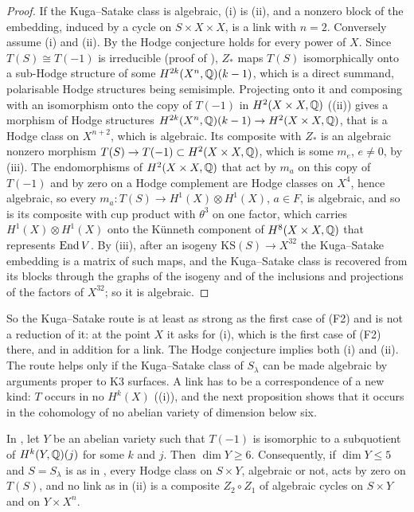 \begin{proof}
If the Kuga--Satake class is algebraic, (i) is (ii), and a
nonzero block of the embedding, induced by a cycle on $S\times X\times X$, is
a link with $n=2$. Conversely assume (i) and (ii). By
 the Hodge conjecture holds for every power of $X$.
Since $T(S)\cong T(-1)$ is irreducible (proof of ),
$Z_{*}$ maps $T(S)$ isomorphically onto a sub-Hodge structure of some
$H^{2k}(X^{n},\mathbb{Q})(k-1)$, which is a direct summand, polarisable Hodge
structures being semisimple. Projecting onto it and composing with an
isomorphism onto the copy of $T(-1)$ in $H^{2}(X\times X,\mathbb{Q})$
((ii)) gives a morphism of Hodge structures
$H^{2k}(X^{n},\mathbb{Q})(k-1)\to H^{2}(X\times X,\mathbb{Q})$, that is a Hodge class on
$X^{n+2}$, which is algebraic. Its composite with $Z_{*}$ is an algebraic
nonzero morphism $T(S)\to T(-1)\subset H^{2}(X\times X,\mathbb{Q})$, which is some
$m_{e}$, $e\ne0$, by (iii). The endomorphisms of
$H^{2}(X\times X,\mathbb{Q})$ that act by $m_{a}$ on this copy of $T(-1)$ and by zero
on a Hodge complement are Hodge classes on $X^{4}$, hence algebraic, so every
$m_{a}\colon T(S)\to H^{1}(X)\otimes H^{1}(X)$, $a\in F$, is algebraic, and so is
its composite with cup product with $\theta^{3}$ on one factor, which carries
$H^{1}(X)\otimes H^{1}(X)$ onto the K\"unneth component of $H^{8}(X\times X,\mathbb{Q})$
that represents $\operatorname{End} V$. By (iii), after an isogeny
$\mathrm{KS}(S)\to X^{32}$ the Kuga--Satake embedding is a matrix of such
maps, and the Kuga--Satake class is recovered from its blocks through the
graphs of the isogeny and of the inclusions and projections of the factors of
$X^{32}$; so it is algebraic.
\end{proof}

So the Kuga--Satake route is at least as strong as the first case of (F2) and
is not a reduction of it: at the point $X$ it asks for (i), which is the first
case of (F2) there, and in addition for a link. The Hodge conjecture
implies both (i) and (ii). The route helps only if the
Kuga--Satake class of $S_{\lambda}$ can be made algebraic by arguments proper
to K3 surfaces. A link has to be a correspondence of a new kind: $T$ occurs
in no $H^{k}(X)$ ((i)), and the next proposition
shows that it occurs in the cohomology of no abelian variety of dimension
below six.

\begin{proposition}\label{prop:mumfordcarrier}
In , let $Y$ be an abelian variety such that $T(-1)$ is
isomorphic to a subquotient of $H^{k}(Y,\mathbb{Q})(j)$ for some $k$ and $j$. Then
$\dim Y\ge6$. Consequently, if $\dim Y\le5$ and $S=S_{\lambda}$ is as in
, every Hodge class on $S\times Y$, algebraic or not, acts
by zero on $T(S)$, and no link as in (ii) is a
composite $Z_{2}\circ Z_{1}$ of algebraic cycles on $S\times Y$ and on
$Y\times X^{n}$.
\end{proposition}

